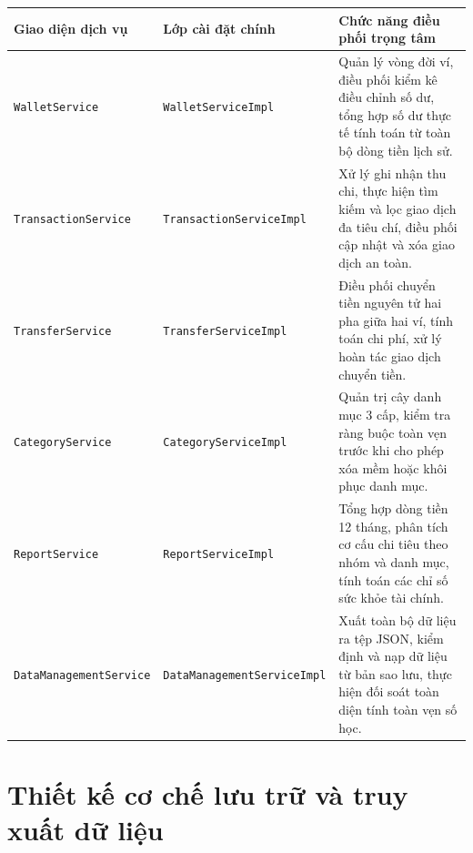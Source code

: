 \documentclass[a4paper,12pt]{report}
\newcommand{\passthrough}[1]{#1}
\newcounter{none}
\begin{document}
{\def\LTcaptype{none} %
\begin{longtable}[]{@{}
  >{\raggedright\arraybackslash}p{}
  >{\raggedright\arraybackslash}p{}
  >{\raggedright\arraybackslash}p{}@{}}
\toprule\noalign{}
\begin{minipage}[b]{\linewidth}\raggedright
Giao diện dịch vụ
\end{minipage} & \begin{minipage}[b]{\linewidth}\raggedright
Lớp cài đặt chính
\end{minipage} & \begin{minipage}[b]{\linewidth}\raggedright
Chức năng điều phối trọng tâm
\end{minipage} \\
\midrule\noalign{}
\endhead
\bottomrule\noalign{}
\endlastfoot
\passthrough{\lstinline!WalletService!} &
\passthrough{\lstinline!WalletServiceImpl!} & Quản lý vòng đời ví, điều
phối kiểm kê điều chỉnh số dư, tổng hợp số dư thực tế tính toán từ toàn
bộ dòng tiền lịch sử. \\
\passthrough{\lstinline!TransactionService!} &
\passthrough{\lstinline!TransactionServiceImpl!} & Xử lý ghi nhận thu
chi, thực hiện tìm kiếm và lọc giao dịch đa tiêu chí, điều phối cập nhật
và xóa giao dịch an toàn. \\
\passthrough{\lstinline!TransferService!} &
\passthrough{\lstinline!TransferServiceImpl!} & Điều phối chuyển tiền
nguyên tử hai pha giữa hai ví, tính toán chi phí, xử lý hoàn tác giao
dịch chuyển tiền. \\
\passthrough{\lstinline!CategoryService!} &
\passthrough{\lstinline!CategoryServiceImpl!} & Quản trị cây danh mục 3
cấp, kiểm tra ràng buộc toàn vẹn trước khi cho phép xóa mềm hoặc khôi
phục danh mục. \\
\passthrough{\lstinline!ReportService!} &
\passthrough{\lstinline!ReportServiceImpl!} & Tổng hợp dòng tiền 12
tháng, phân tích cơ cấu chi tiêu theo nhóm và danh mục, tính toán các
chỉ số sức khỏe tài chính. \\
\passthrough{\lstinline!DataManagementService!} &
\passthrough{\lstinline!DataManagementServiceImpl!} & Xuất toàn bộ dữ
liệu ra tệp JSON, kiểm định và nạp dữ liệu từ bản sao lưu, thực hiện đối
soát toàn diện tính toàn vẹn số học. \\
\end{longtable}
}

\section{Thiết kế cơ chế lưu trữ và truy xuất dữ
liệu}\label{thiux1ebft-kux1ebf-cux1a1-chux1ebf-lux1b0u-trux1eef-vuxe0-truy-xuux1ea5t-dux1eef-liux1ec7u}
\end{document}
